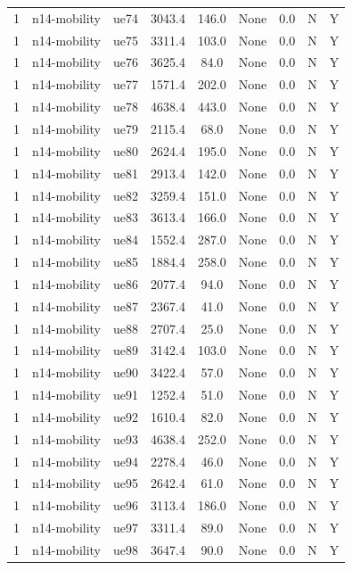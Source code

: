 \begin{table}[ht]
\begin{tabular}{|c|c|c|c|c|c|c|c|c|}
1 & n14-mobility & ue74 & 3043.4 & 146.0 & None & 0.0 & N & Y \\
1 & n14-mobility & ue75 & 3311.4 & 103.0 & None & 0.0 & N & Y \\
1 & n14-mobility & ue76 & 3625.4 & 84.0 & None & 0.0 & N & Y \\
1 & n14-mobility & ue77 & 1571.4 & 202.0 & None & 0.0 & N & Y \\
1 & n14-mobility & ue78 & 4638.4 & 443.0 & None & 0.0 & N & Y \\
1 & n14-mobility & ue79 & 2115.4 & 68.0 & None & 0.0 & N & Y \\
1 & n14-mobility & ue80 & 2624.4 & 195.0 & None & 0.0 & N & Y \\
1 & n14-mobility & ue81 & 2913.4 & 142.0 & None & 0.0 & N & Y \\
1 & n14-mobility & ue82 & 3259.4 & 151.0 & None & 0.0 & N & Y \\
1 & n14-mobility & ue83 & 3613.4 & 166.0 & None & 0.0 & N & Y \\
1 & n14-mobility & ue84 & 1552.4 & 287.0 & None & 0.0 & N & Y \\
1 & n14-mobility & ue85 & 1884.4 & 258.0 & None & 0.0 & N & Y \\
1 & n14-mobility & ue86 & 2077.4 & 94.0 & None & 0.0 & N & Y \\
1 & n14-mobility & ue87 & 2367.4 & 41.0 & None & 0.0 & N & Y \\
1 & n14-mobility & ue88 & 2707.4 & 25.0 & None & 0.0 & N & Y \\
1 & n14-mobility & ue89 & 3142.4 & 103.0 & None & 0.0 & N & Y \\
1 & n14-mobility & ue90 & 3422.4 & 57.0 & None & 0.0 & N & Y \\
1 & n14-mobility & ue91 & 1252.4 & 51.0 & None & 0.0 & N & Y \\
1 & n14-mobility & ue92 & 1610.4 & 82.0 & None & 0.0 & N & Y \\
1 & n14-mobility & ue93 & 4638.4 & 252.0 & None & 0.0 & N & Y \\
1 & n14-mobility & ue94 & 2278.4 & 46.0 & None & 0.0 & N & Y \\
1 & n14-mobility & ue95 & 2642.4 & 61.0 & None & 0.0 & N & Y \\
1 & n14-mobility & ue96 & 3113.4 & 186.0 & None & 0.0 & N & Y \\
1 & n14-mobility & ue97 & 3311.4 & 89.0 & None & 0.0 & N & Y \\
1 & n14-mobility & ue98 & 3647.4 & 90.0 & None & 0.0 & N & Y \\

\end{tabular}
\end{table}
